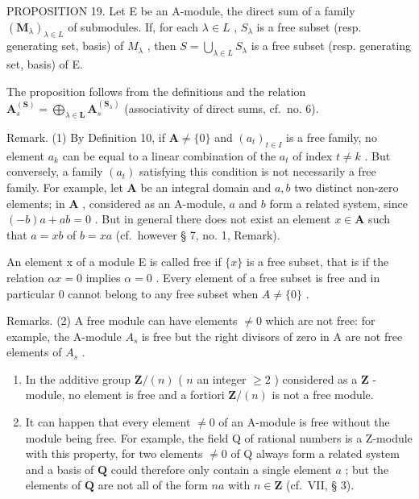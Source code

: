 PROPOSITION 19. Let E be an A-module, the direct sum of a family \((\mathbf{M}_{\lambda})_{\lambda \in L}\) of submodules. If, for each \(\lambda \in L\) , \(S_{\lambda}\) is a free subset (resp. generating set, basis) of \(M_{\lambda}\) , then \(S = \bigcup_{\lambda \in L} S_{\lambda}\) is a free subset (resp. generating set, basis) of E.

The proposition follows from the definitions and the relation \(\mathbf{A}_{s}^{(\mathbf{S})} = \bigoplus_{\lambda \in \mathbf{L}} \mathbf{A}_{s}^{(\mathbf{S}_{\lambda})}\) (associativity of direct sums, cf.~no. 6).

Remark. (1) By Definition 10, if \(\mathbf{A} \neq \{0\}\) and \((a_{t})_{t \in I}\) is a free family, no element \(a_{k}\) can be equal to a linear combination of the \(a_{t}\) of index \(t \neq k\) . But conversely, a family \((a_{t})\) satisfying this condition is not necessarily a free family. For example, let \(\mathbf{A}\) be an integral domain and \(a, b\) two distinct non-zero elements; in \(\mathbf{A}\) , considered as an A-module, \(a\) and \(b\) form a related system, since \((-b)a + ab = 0\) . But in general there does not exist an element \(x \in \mathbf{A}\) such that \(a = xb\) of \(b = xa\) (cf.~however § 7, no. 1, Remark).

An element x of a module E is called free if \(\{x\}\) is a free subset, that is if the relation \(\alpha x = 0\) implies \(\alpha = 0\) . Every element of a free subset is free and in particular 0 cannot belong to any free subset when \(A \neq \{0\}\) .

Remarks. (2) A free module can have elements \(\neq0\) which are not free: for example, the A-module \(A_{s}\) is free but the right divisors of zero in A are not free elements of \(A_{s}\) .

\begin{enumerate}
\def\labelenumi{(\arabic{enumi})}
\setcounter{enumi}{2}
\item
  In the additive group \(\mathbf{Z} / (n)\) ( \(n\) an integer \(\geqslant 2\) ) considered as a \(\mathbf{Z}\) -module, no element is free and a fortiori \(\mathbf{Z} / (n)\) is not a free module.
\item
  It can happen that every element \(\neq0\) of an A-module is free without the module being free. For example, the field Q of rational numbers is a Z-module with this property, for two elements \(\neq0\) of Q always form a related system and a basis of \(\mathbf{Q}\) could therefore only contain a single element \(a\) ; but the elements of \(\mathbf{Q}\) are not all of the form \(na\) with \(n \in \mathbf{Z}\) (cf.~VII, § 3).
\end{enumerate}

